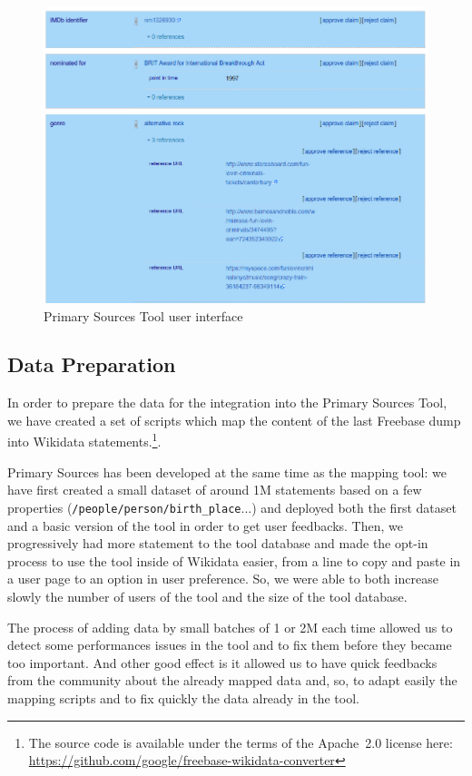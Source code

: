\documentclass{sig-alternate}
\begin{document}
\begin{figure}[!htbp]
\centering
\includegraphics[width=8.45 cm]{img/primary-sources.png}
\caption{Primary Sources Tool user interface}
\label{fig:primary-sources-tool}
\end{figure}

\subsection{Data Preparation}

In order to prepare the data for the integration into the Primary Sources Tool, we have created a set of scripts which map the content of the last Freebase dump into Wikidata statements.\footnote{The source code is available under the terms of the Apache~2.0 license here: \url{https://github.com/google/freebase-wikidata-converter}}.

Primary Sources has been developed at the same time as the mapping tool: we have first created a small dataset of around 1M statements based on a few properties (\texttt{/people/person/birth\_place}...) and deployed both the first dataset and a basic version of the tool in order to get user feedbacks. Then, we progressively had more statement to the tool database and made the opt-in process to use the tool inside of Wikidata easier, from a line to copy and paste in a user page to an option in user preference. So, we were able to both increase slowly the number of users of the tool and the size of the tool database.

The process of adding data by small batches of 1 or 2M each time allowed us to detect some performances issues in the tool and to fix them before they became too important. And other good effect is it allowed us to have quick feedbacks from the community about the already mapped data and, so, to adapt easily the mapping scripts and to fix quickly the data already in the tool.
\end{document}
